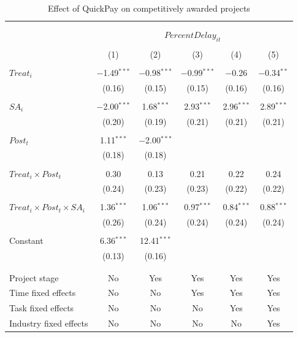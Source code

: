 \documentclass[
]{article}
\begin{document}
\begin{table}[H] \centering 
  \caption{Effect of QuickPay on competitively awarded projects} 
  \label{} 
\small 
\begin{tabular}{@{\extracolsep{-2pt}}lccccc} 
\\[-1.8ex]\hline 
\hline \\[-1.8ex] 
\\[-1.8ex] & \multicolumn{5}{c}{$PercentDelay_{it}$  } \\ 
\\[-1.8ex] & (1) & (2) & (3) & (4) & (5)\\ 
\hline \\[-1.8ex] 
 $Treat_i$ & $-$1.49$^{***}$ & $-$0.98$^{***}$ & $-$0.99$^{***}$ & $-$0.26 & $-$0.34$^{**}$ \\ 
  & (0.16) & (0.15) & (0.15) & (0.16) & (0.16) \\ 
  & & & & & \\ 
 $SA_i$ & $-$2.00$^{***}$ & 1.68$^{***}$ & 2.93$^{***}$ & 2.96$^{***}$ & 2.89$^{***}$ \\ 
  & (0.20) & (0.19) & (0.21) & (0.21) & (0.21) \\ 
  & & & & & \\ 
 $Post_t$ & 1.11$^{***}$ & $-$2.00$^{***}$ &  &  &  \\ 
  & (0.18) & (0.18) &  &  &  \\ 
  & & & & & \\ 
 $Treat_i \times Post_t$ & 0.30 & 0.13 & 0.21 & 0.22 & 0.24 \\ 
  & (0.24) & (0.23) & (0.23) & (0.22) & (0.22) \\ 
  & & & & & \\ 
 $Treat_i \times Post_t \times SA_i $ & 1.36$^{***}$ & 1.06$^{***}$ & 0.97$^{***}$ & 0.84$^{***}$ & 0.88$^{***}$ \\ 
  & (0.26) & (0.24) & (0.24) & (0.24) & (0.24) \\ 
  & & & & & \\ 
 Constant & 6.36$^{***}$ & 12.41$^{***}$ &  &  &  \\ 
  & (0.13) & (0.16) &  &  &  \\ 
  & & & & & \\ 
\hline \\[-1.8ex] 
Project stage & No & Yes & Yes & Yes & Yes \\ 
Time fixed effects & No & No & Yes & Yes & Yes \\ 
Task fixed effects & No & No & No & Yes & Yes \\ 
Industry fixed effects & No & No & No & No & Yes \\ 

\end{tabular}
\end{table}
\end{document}

